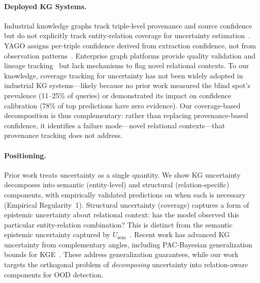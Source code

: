 \paragraph{Deployed KG Systems.}
Industrial knowledge graphs track triple-level provenance and source confidence but do not explicitly track entity-relation coverage for uncertainty estimation~\citep{hogan2021knowledge}. YAGO assigns per-triple confidence derived from extraction confidence, not from observation patterns~\citep{suchanek2007yago}. Enterprise graph platforms provide quality validation and lineage tracking~\citep{noy2019industry} but lack mechanisms to flag novel relational contexts. To our knowledge, coverage tracking for uncertainty has not been widely adopted in industrial KG systems---likely because no prior work measured the blind spot's prevalence (11--25\% of queries) or demonstrated its impact on confidence calibration (78\% of top predictions have zero evidence). Our coverage-based decomposition is thus complementary: rather than replacing provenance-based confidence, it identifies a failure mode---novel relational contexts---that provenance tracking does not address.

\paragraph{Positioning.}
Prior work treats uncertainty as a single quantity. We show KG uncertainty decomposes into semantic (entity-level) and structural (relation-specific) components, with empirically validated predictions on when each is necessary (Empirical Regularity~1).
Structural uncertainty (coverage) captures a form of epistemic uncertainty about relational context: has the model observed this particular entity-relation combination? This is distinct from the semantic epistemic uncertainty captured by $U_{\text{sem}}$~\citep{kendall2017uncertainties}.
Recent work has advanced KG uncertainty from complementary angles, including PAC-Bayesian generalization bounds for KGE~\citep{lee2024pacbayesian}. These address generalization guarantees, while our work targets the orthogonal problem of \emph{decomposing} uncertainty into relation-aware components for OOD detection.


